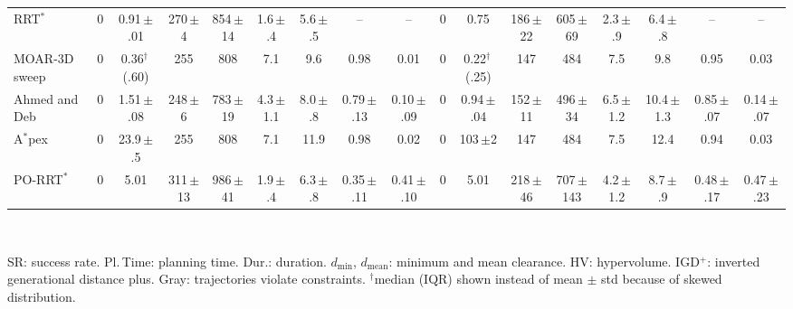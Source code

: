 \documentclass[journal]{IEEEtran}
\newcommand{\sd}[1]{\,{\fontsize{5}{6}\selectfont #1}}    %
\newcommand{\rx}[1]{\textcolor{black!50}{#1}}            %
\begin{document}
\begin{table}[t]
\begin{tabular*}{\textwidth}{@{\extracolsep{\fill}}l@{\hspace{10pt}}cccccccccccccccc@{}}
\rx{RRT$^*$} & \rx{0} & \rx{0.91\sd{$\pm$.01}} & \rx{270\sd{$\pm$4}} & \rx{854\sd{$\pm$14}} & \rx{1.6\sd{$\pm$.4}} & \rx{5.6\sd{$\pm$.5}} & -- & -- & \rx{0} & \rx{0.75} & \rx{186\sd{$\pm$22}} & \rx{605\sd{$\pm$69}} & \rx{2.3\sd{$\pm$.9}} & \rx{6.4\sd{$\pm$.8}} & -- & -- \\
\rx{MOAR-3D~\cite{petit2024} sweep} & \rx{0} & \rx{0.36$^\dagger$\sd{(.60)}} & \rx{255} & \rx{808} & \rx{7.1} & \rx{9.6} & \rx{0.98} & \rx{0.01} & \rx{0} & \rx{0.22$^\dagger$\sd{(.25)}} & \rx{147} & \rx{484} & \rx{7.5} & \rx{9.8} & \rx{0.95} & \rx{0.03} \\
\rx{Ahmed and Deb~\cite{ahmed2011}} & \rx{0} & \rx{1.51\sd{$\pm$.08}} & \rx{248\sd{$\pm$6}} & \rx{783\sd{$\pm$19}} & \rx{4.3\sd{$\pm$1.1}} & \rx{8.0\sd{$\pm$.8}} & \rx{0.79\sd{$\pm$.13}} & \rx{0.10\sd{$\pm$.09}} & \rx{0} & \rx{0.94\sd{$\pm$.04}} & \rx{152\sd{$\pm$11}} & \rx{496\sd{$\pm$34}} & \rx{6.5\sd{$\pm$1.2}} & \rx{10.4\sd{$\pm$1.3}} & \rx{0.85\sd{$\pm$.07}} & \rx{0.14\sd{$\pm$.07}} \\
\rx{A$^*$pex~\cite{zhang2022}} & \rx{0} & \rx{23.9\sd{$\pm$.5}} & \rx{255} & \rx{808} & \rx{7.1} & \rx{11.9} & \rx{0.98} & \rx{0.02} & \rx{0} & \rx{103\sd{$\pm$2}} & \rx{147} & \rx{484} & \rx{7.5} & \rx{12.4} & \rx{0.94} & \rx{0.03} \\
\rx{PO-RRT$^*$~\cite{batonisashvili2026}} & \rx{0} & \rx{5.01} & \rx{311\sd{$\pm$13}} & \rx{986\sd{$\pm$41}} & \rx{1.9\sd{$\pm$.4}} & \rx{6.3\sd{$\pm$.8}} & \rx{0.35\sd{$\pm$.11}} & \rx{0.41\sd{$\pm$.10}} & \rx{0} & \rx{5.01} & \rx{218\sd{$\pm$46}} & \rx{707\sd{$\pm$143}} & \rx{4.2\sd{$\pm$1.2}} & \rx{8.7\sd{$\pm$.9}} & \rx{0.48\sd{$\pm$.17}} & \rx{0.47\sd{$\pm$.23}} \\
\bottomrule
\end{tabular*}
\\[2pt]
\parbox{\textwidth}{\fontsize{6}{7}\selectfont SR: success rate. Pl.\,Time: planning time. Dur.: duration. $d_\text{min}$, $d_\text{mean}$: minimum and mean clearance. HV: hypervolume. IGD$^+$: inverted generational distance plus. \rx{Gray: trajectories violate constraints.} $^\dagger$median (IQR) shown instead of mean $\pm$ std because of skewed distribution.}
\end{table}
\end{document}
